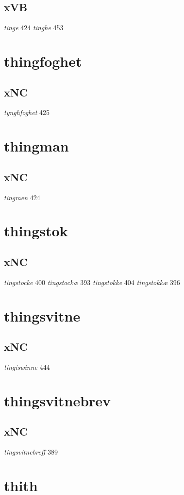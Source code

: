 \documentclass[a4paper,twocolumn]{article}
\begin{document}
\subsection{xVB}
\label{sec:org4a8e8d7}
\emph{tinge} 424 \emph{tinghe} 453 
\section{thingfoghet}
\label{sec:orgb77d2a2}
\subsection{xNC}
\label{sec:org97bd3e5}
\emph{tynghfoghet} 425 
\section{thingman}
\label{sec:orgacc06c0}
\subsection{xNC}
\label{sec:org1954467}
\emph{tingmen} 424 
\section{thingstok}
\label{sec:orgabf50b8}
\subsection{xNC}
\label{sec:org3ea789b}
\emph{tingstocke} 400 \emph{tingstockæ} 393 \emph{tingstokke} 404 \emph{tingstokkæ} 396 
\section{thingsvitne}
\label{sec:org27466c9}
\subsection{xNC}
\label{sec:org61eb65a}
\emph{tingiswinne} 444 
\section{thingsvitnebrev}
\label{sec:org895f2c9}
\subsection{xNC}
\label{sec:org1543709}
\emph{tingsvitnebreff} 389 
\section{thith}
\label{sec:org496ddff}
\end{document}
